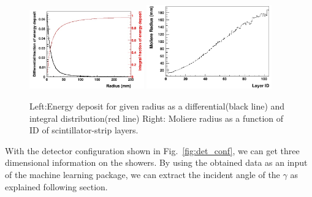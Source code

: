 \documentclass[jkps,preprint,fleqn,showpacs,showkeys]{revtex4}
\begin{document}
\begin{figure}[!hbt]
\includegraphics[width=0.44\textwidth]{figures/Edep_R.jpg}
\includegraphics[width=0.48\textwidth]{figures/Moliere_layer.jpg}
\caption{Left:Energy deposit for given radius as a differential(black line) and integral distribution(red line) Right: Moliere radius as a function of ID of scintillator-strip layers.}
\label{fig:Moliere_vis}
\end{figure}

With the detector configuration shown in Fig.~\ref{fig:det_conf}, we can get three dimensional information on the showers. By using the obtained data as an input of the machine learning package, we can extract the incident angle of the $\gamma$ as explained following section. 
\end{document}
